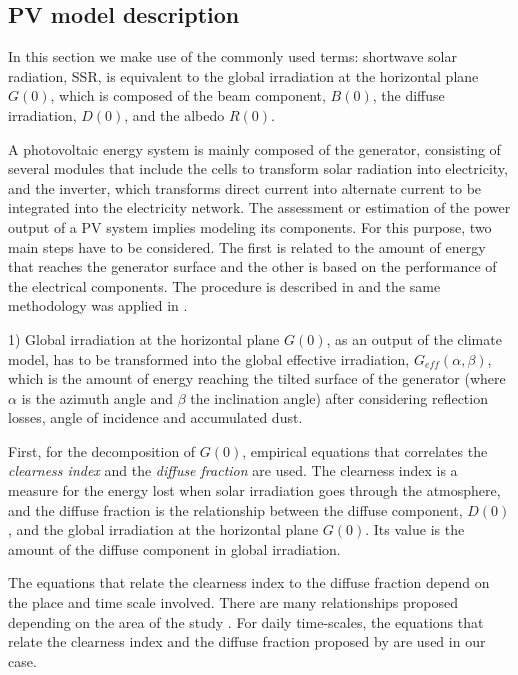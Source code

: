 
\subsection{PV model description}

In this section we make use of the commonly used terms: shortwave solar radiation, SSR, is equivalent to the global irradiation at the horizontal plane $G(0)$, which is composed of the beam component, $B(0)$, the diffuse irradiation, $D(0)$, and the albedo $R(0)$.

A photovoltaic energy system is mainly composed of the generator, consisting of several modules that include the cells to transform solar radiation into electricity, and the inverter, which transforms direct current into alternate current to be integrated into the electricity network. The assessment or estimation of the power output of a PV system implies modeling its components. For this purpose, two main steps have to be considered. The first is related to the amount of energy that reaches the generator surface and the other is based on the performance of the electrical components. The procedure is described in \cite{Perpinan2009} and the same methodology was applied in \cite{Gutierrez2017}.

1) Global irradiation at the horizontal plane $G(0)$, as an output of the climate model, has to be transformed into the global effective irradiation, $G_{eff}(\alpha, \beta)$, which is the amount of energy reaching the tilted surface of the generator (where $\alpha$ is the azimuth angle and $\beta$ the inclination angle) after considering reflection losses, angle of incidence and accumulated dust.  

First, for the decomposition of $G(0)$, empirical equations that correlates the \textit{clearness index} and the \textit{diffuse fraction} \citep{Page1961} are used. The clearness index is a measure for the energy lost when solar irradiation goes through the atmosphere, and the diffuse fraction is the relationship between the diffuse component, $D(0)$, and the global irradiation at the horizontal plane $G(0)$. Its value is the amount of the diffuse component in global irradiation.

The equations that relate the clearness index to the diffuse fraction depend on the place and time scale involved. There are many relationships proposed depending on the area of the study \citep{deMiguel2001, Gopinathan1995}. For daily time-scales, the equations that relate the clearness index and the diffuse fraction proposed by \cite{Aguiar1992} are used in our case. 

